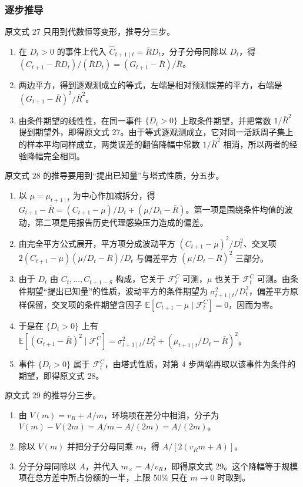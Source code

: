 \subsubsection{逐步推导}

原文式 27 只用到代数恒等变形，推导分三步。
\begin{enumerate}
\item 在 $D_t>0$ 的事件上代入 $\widehat C_{t+1\mid t}=\bar RD_t$，分子分母同除以 $D_t$，得 $(C_{t+1}-\bar RD_t)/(\bar RD_t)=(G_{t+1}-\bar R)/\bar R$。
\item 两边平方，得到逐观测成立的等式，左端是相对预测误差的平方，右端是 $(G_{t+1}-\bar R)^2/\bar R^2$。
\item 由条件期望的线性性，在同一事件 $\{D_t>0\}$ 上取条件期望，并把常数 $1/\bar R^2$ 提到期望外，即得原文式 27。由于等式逐观测成立，它对同一活跃周子集上的样本平均同样成立，两类误差的翻倍降幅中常数 $1/\bar R^2$ 相消，所以两者的经验降幅完全相同。
\end{enumerate}

原文式 28 的推导要用到“提出已知量”与塔式性质，分五步。
\begin{enumerate}
\item 以 $\mu=\mu_{t+1\mid t}$ 为中心作加减拆分，得 $G_{t+1}-\bar R=(C_{t+1}-\mu)/D_t+(\mu/D_t-\bar R)$。第一项是围绕条件均值的波动，第二项是用报告历史代理感染压力造成的偏差。
\item 由完全平方公式展开，平方项分成波动平方 $(C_{t+1}-\mu)^2/D_t^2$、交叉项 $2(C_{t+1}-\mu)(\mu/D_t-\bar R)/D_t$ 与偏差平方 $(\mu/D_t-\bar R)^2$ 三部分。
\item 由于 $D_t$ 由 $C_t,\dots,C_{t+1-S}$ 构成，它关于 $\mathcal F_t^C$ 可测，$\mu$ 也关于 $\mathcal F_t^C$ 可测。由条件期望“提出已知量”的性质，波动平方的条件期望为 $\sigma^2_{t+1\mid t}/D_t^2$，偏差平方原样保留，交叉项的条件期望含因子 $\mathbb E[C_{t+1}-\mu\mid\mathcal F_t^C]=0$，因而为零。
\item 于是在 $\{D_t>0\}$ 上有 $\mathbb E[(G_{t+1}-\bar R)^2\mid\mathcal F_t^C]=\sigma^2_{t+1\mid t}/D_t^2+(\mu_{t+1\mid t}/D_t-\bar R)^2$。
\item 事件 $\{D_t>0\}$ 属于 $\mathcal F_t^C$，由塔式性质，对第 4 步两端再取以该事件为条件的期望，即得原文式 28。
\end{enumerate}

原文式 29 的推导分三步。
\begin{enumerate}
\item 由 $V(m)=v_R+A/m$，环境项在差分中相消，分子为 $V(m)-V(2m)=A/m-A/(2m)=A/(2m)$。
\item 除以 $V(m)$ 并把分子分母同乘 $m$，得 $A/[2(v_Rm+A)]$。
\item 分子分母同除以 $A$，并代入 $m_\times=A/v_R$，即得原文式 29。这个降幅等于规模项在总方差中所占份额的一半，上限 50\% 只在 $m\to0$ 时取到。
\end{enumerate}


